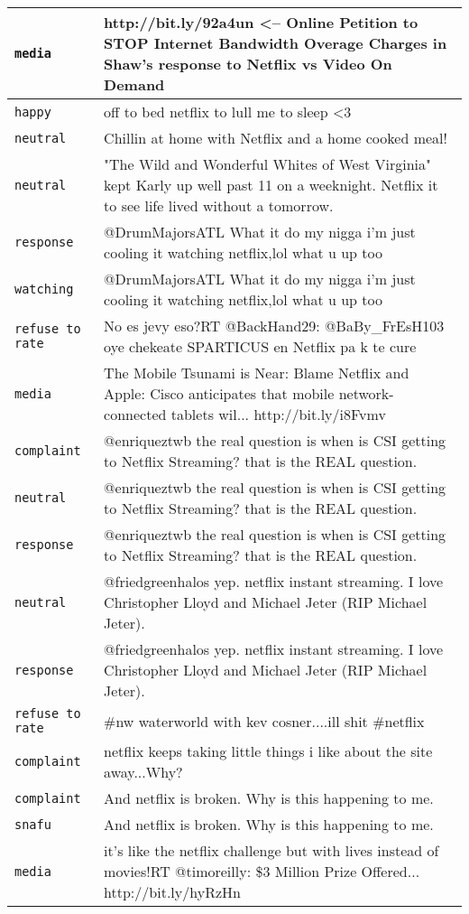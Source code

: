 \begin{center}
\begin{longtable}{|l|p{120mm}|}
      \tabularnewline\hline
         \texttt{media} & http://bit.ly/92a4un <-- Online Petition to STOP Internet Bandwidth Overage Charges in Shaw's response to Netflix vs Video On Demand
      \tabularnewline\hline
         \texttt{happy} & off to bed netflix to lull me to sleep <3
      \tabularnewline\hline
         \texttt{neutral} & Chillin at home with Netflix and a home cooked meal!
      \tabularnewline\hline
         \texttt{neutral} & "The Wild and Wonderful Whites of West Virginia" kept Karly up well past 11 on a weeknight. Netflix it to see life lived without a tomorrow.
      \tabularnewline\hline
         \texttt{response} & @DrumMajorsATL What it do my nigga i'm just cooling it watching netflix,lol what u up too
      \tabularnewline\hline
         \texttt{watching} & @DrumMajorsATL What it do my nigga i'm just cooling it watching netflix,lol what u up too
      \tabularnewline\hline
         \texttt{refuse to rate} & No es jevy eso?RT @BackHand29: @BaBy\_FrEsH103 oye chekeate SPARTICUS en Netflix pa k te cure
      \tabularnewline\hline
         \texttt{media} & The Mobile Tsunami is Near: Blame Netflix and Apple: Cisco anticipates that mobile network-connected tablets wil... http://bit.ly/i8Fvmv
      \tabularnewline\hline
         \texttt{complaint} & @enriqueztwb the real question is when is CSI getting to Netflix Streaming? that is the REAL question.
      \tabularnewline\hline
         \texttt{neutral} & @enriqueztwb the real question is when is CSI getting to Netflix Streaming? that is the REAL question.
      \tabularnewline\hline
         \texttt{response} & @enriqueztwb the real question is when is CSI getting to Netflix Streaming? that is the REAL question.
      \tabularnewline\hline
         \texttt{neutral} & @friedgreenhalos yep. netflix instant streaming. I love Christopher Lloyd and Michael Jeter (RIP Michael Jeter).
      \tabularnewline\hline
         \texttt{response} & @friedgreenhalos yep. netflix instant streaming. I love Christopher Lloyd and Michael Jeter (RIP Michael Jeter).
      \tabularnewline\hline
         \texttt{refuse to rate} & \#nw waterworld with kev cosner....ill shit \#netflix
      \tabularnewline\hline
         \texttt{complaint} & netflix keeps taking little things i like about the site away...Why?
      \tabularnewline\hline
         \texttt{complaint} & And netflix is broken. Why is this happening to me.
      \tabularnewline\hline
         \texttt{snafu} & And netflix is broken. Why is this happening to me.
      \tabularnewline\hline
         \texttt{media} & it's like the netflix challenge but with lives instead of movies!RT @timoreilly: \$3 Million Prize Offered... http://bit.ly/hyRzHn

\end{longtable}
\end{center}
